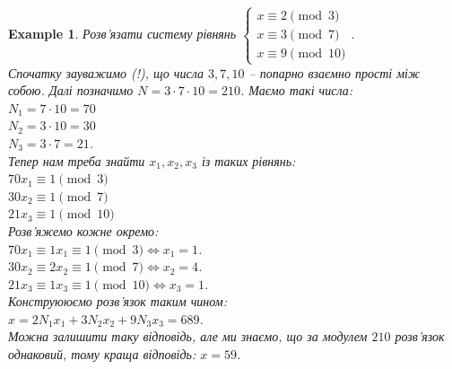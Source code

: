 \documentclass[a4paper, 10pt]{article}
\theoremstyle{theoremdd}
\theoremstyle{theoremdd}
\theoremstyle{theoremdd}
\theoremstyle{theoremdd}
\newtheorem{example}[theorem]{Example}
\theoremstyle{theoremdd}
\theoremstyle{theoremdd}
\theoremstyle{theoremdd}
\theoremstyle{theoremdd}
\begin{document}
\begin{example}
Розв'язати систему рівнянь $\begin{cases} 
x \equiv 2 \pmod 3 \\
x \equiv 3 \pmod 7 \\
x  \equiv 9 \pmod {10}
 \end{cases}$.\\
Спочатку зауважимо (!), що числа $3,7,10$ -- попарно взаємно прості між собою. Далі позначимо $N = 3 \cdot 7 \cdot 10 = 210$. Маємо такі числа: \\$N_1 = 7 \cdot 10 = 70$ \\
$N_2 = 3 \cdot 10 = 30$ \\
$N_3 = 3 \cdot 7 = 21$. \\
Тепер нам треба знайти $x_1,x_2,x_3$ із таких рівнянь:\\
$70x_1 \equiv 1 \pmod 3$\\
$30x_2 \equiv 1 \pmod 7$\\
$21x_3 \equiv 1 \pmod {10}$\\
Розв'яжемо кожне окремо:\\
$70x_1 \equiv 1x_1 \equiv 1 \pmod 3 \iff x_1 = 1$.\\
$30x_2 \equiv 2x_2 \equiv 1 \pmod 7 \iff x_2 = 4$.\\
$21x_3 \equiv 1x_3 \equiv 1 \pmod {10} \iff x_3 = 1$.\\
Конструююємо розв'язок таким чином:\\
$x = 2N_1x_1 + 3N_2x_2 + 9N_3x_3 = 689$.\\
Можна залишити таку відповідь, але ми знаємо, що за модулем $210$ розв'язок однаковий, тому краща відповідь: $x = 59$.
\end{example}
\end{document}
